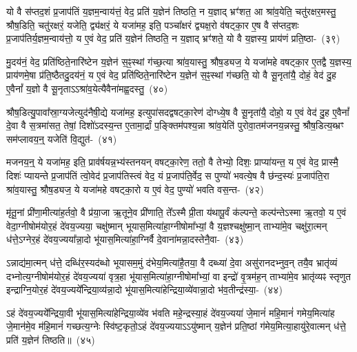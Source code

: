 {\anuvakamend[{तेनै॒व ब्रह्म॑ रा॒ष्ट्रमे॒वास्य॑ य॒ज्ञस्य॑ प्राजाप॒त्यꣳ षट्त्रिꣳ॑शच्च}]}%

यो वै स॑प्तद॒शं प्र॒जा\-प॑तिं य॒ज्ञम॒न्वाय॑त्तं॒ वेद॒ प्रति॑ य॒ज्ञेन॑ तिष्ठति॒ न य॒ज्ञाद् भ्रꣳ॑शत॒ आ श्रा॑व॒येति॒ चतु॑रक्षर॒मस्तु॒ श्रौष॒डिति॒ चतु॑रक्षरं॒ यजेति॒ द्व्य॑क्षरं॒ ये यजा॑मह॒ इति॒ पञ्चा᳚क्षरं द्व्यक्ष॒रो व॑षट्का॒र ए॒ष वै स॑प्तद॒शः प्र॒जा\-प॑तिर्य॒ज्ञम॒न्वाय॑त्तो॒ य ए॒वं वेद॒ प्रति॑ य॒ज्ञेन॑ तिष्ठति॒ न य॒ज्ञाद् भ्रꣳ॑शते॒ यो वै य॒ज्ञस्य॒ प्राय॑णं प्रति॒ष्ठा-~(३९)

मु॒दय॑नं॒ वेद॒ प्रति॑ष्ठिते॒नारि॑ष्टेन य॒ज्ञेन॑ स॒ꣴ॒स्थां ग॑च्छ॒त्या श्रा॑व॒यास्तु॒ श्रौष॒ड्यज॒ ये यजा॑महे वषट्का॒र ए॒तद्वै य॒ज्ञस्य॒ प्राय॑णमे॒षा प्र॑ति॒ष्ठैतदु॒दय॑नं॒ य ए॒वं वेद॒ प्रति॑ष्ठिते॒नारि॑ष्टेन य॒ज्ञेन॑ स॒ꣴ॒स्थां ग॑च्छति॒ यो वै सू॒नृता॑यै॒ दोहं॒ वेद॑ दु॒ह ए॒वैनां᳚ य॒ज्ञो वै सू॒नृता\-ऽ\-ऽश्रा॑व॒येत्यैवैना॑मह्व॒दस्तु॒~(४०)

श्रौष॒डित्यु॒पावा᳚स्रा॒ग्यजेत्युद॑नैषी॒द्ये यजा॑मह॒ इत्युपा॑स\-दद्वषट्का॒रेण॑ दोग्ध्ये॒ष वै सू॒नृता॑यै॒ दोहो॒ य ए॒वं वेद॑ दु॒ह ए॒वैनां᳚ दे॒वा वै स॒त्रमा॑सत॒ तेषां॒ दिशो॑\-ऽदस्य॒न्त ए॒तामा॒र्द्रां प॒ङ्क्तिम॑पश्य॒न्ना श्रा॑व॒येति॑ पुरोवा॒तम॑जनय॒न्नस्तु॒ श्रौष॒डित्य॒ब्भ्रꣳ सम॑प्लावय॒न्॒ यजेति॑ वि॒द्युत॑-~(४१)

मजनय॒न्॒ ये यजा॑मह॒ इति॒ प्राव॑र्\mbox{}षयन्न॒भ्य॑स्तनयन् वषट्का॒रेण॒ ततो॒ वै तेभ्यो॒ दिशः॒ प्राप्या॑यन्त॒ य ए॒वं वेद॒ प्रास्मै॒ दिशः॑ प्यायन्ते प्र॒जा\-प॑तिं त्वो॒वेद॑ प्र॒जा\-प॑तिस्त्वं वेद॒ यं प्र॒जा\-प॑ति॒र्वेद॒ स पुण्यो॑ भवत्ये॒ष वै छ॑न्द॒स्यः॑ प्र॒जा\-प॑ति॒रा श्रा॑व॒यास्तु॒ श्रौष॒ड्यज॒ ये यजा॑महे वषट्का॒रो य ए॒वं वेद॒ पुण्यो॑ भवति वस॒न्त-~(४२)

मृ॑तू॒नां प्री॑णा॒मीत्या॑ह॒र्तवो॒ वै प्र॑या॒जा ऋ॒तूने॒व प्री॑णाति॒ ते᳚\-ऽस्मै प्री॒ता य॑थापू॒र्वं क॑ल्पन्ते॒ कल्प॑न्ते\-ऽस्मा ऋ॒तवो॒ य ए॒वं वेदा॒ग्नी\-षोम॑योर॒हं दे॑वय॒ज्यया॒ चक्षु॑ष्मान् भूयास॒मित्या॑हा॒ग्नी\-षोमा᳚भ्यां॒ वै य॒ज्ञश्चक्षु॑ष्मा॒न् ताभ्या॑मे॒व चक्षु॑रा॒त्मन् ध॑त्ते॒\-ऽग्नेर॒हं दे॑वय॒ज्यया᳚न्ना॒दो भू॑यास॒मित्या॑हा॒ग्निर्वै दे॒वाना॑मन्ना॒दस्तेनै॒वा-~(४३)

ऽन्नाद्य॑मा॒त्मन् ध॑त्ते॒ दब्धि॑र॒स्यद॑ब्धो भूयासम॒मुं द॑भेय॒मित्या॑\-है॒तया॒ वै दब्ध्या॑ दे॒वा असु॑रानदभ्नुव॒न् तयै॒व भ्रातृ॑व्यं दभ्नोत्य॒ग्नी\-षोम॑यो\-र॒हं दे॑वय॒ज्यया॑ वृत्र॒हा भू॑यास॒मित्या॑हा॒ग्नी\-षोमा᳚भ्यां॒ वा इन्द्रो॑ वृ॒त्रम॑ह॒न् ताभ्या॑मे॒व भ्रातृ॑व्यꣴ स्तृणुत इन्द्राग्नि॒योर॒हं दे॑व\-य॒ज्यये᳚\-न्द्रिया॒व्य॑न्ना॒दो भू॑यास॒मित्या॑हेन्द्रिया॒व्ये॑वान्ना॒दो भ॑व॒तीन्द्र॑स्या॒-~(४४)

ऽहं दे॑वय॒ज्यये᳚न्द्रिया॒वी भू॑यास॒मित्या॑हेन्द्रिया॒व्ये॑व भ॑वति महे॒न्द्रस्या॒हं दे॑वय॒ज्यया॑ जे॒मानं॑ महि॒मानं॑ गमेय॒मित्या॑ह जे॒मान॑मे॒व म॑हि॒मानं॑ गच्छत्य॒ग्नेः स्वि॑ष्ट॒कृतो॒\-ऽहं दे॑वय॒ज्यया\-ऽ\-ऽयु॑ष्मान् य॒ज्ञेन॑ प्रति॒ष्ठां ग॑मेय॒मित्या॒हायु॑रे॒वात्मन् ध॑त्ते॒ प्रति॑ य॒ज्ञेन॑ तिष्ठति॥~(४५)

